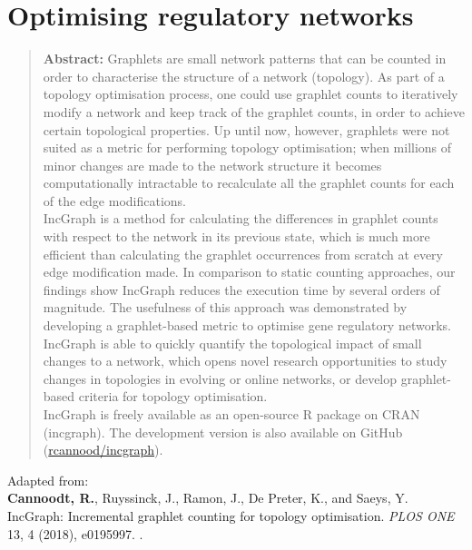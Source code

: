 \newpage{\thispagestyle{empty}\cleardoublepage}
\chapter{Optimising regulatory networks} 
\label{chap:incgraph}

\begin{quote}
	\textbf{Abstract:} Graphlets are small network patterns that can be counted in order to characterise the structure of a network (topology).
	As part of a topology optimisation process, one could use graphlet counts to iteratively modify a network and keep track of the graphlet counts, in order to achieve certain topological properties.
	Up until now, however, graphlets were not suited as a metric for performing topology optimisation; when millions of minor changes are made to the network structure it becomes computationally intractable to recalculate all the graphlet counts for each of the edge modifications. \\ IncGraph is a method for calculating the differences in graphlet counts with respect to the network in its previous state, which is much more efficient than calculating the graphlet occurrences from scratch at every edge modification made.
	In comparison to static counting approaches, our findings show IncGraph reduces the execution time by several orders of magnitude.
	The usefulness of this approach was demonstrated by developing a graphlet-based metric to optimise gene regulatory networks.
	IncGraph is able to quickly quantify the topological impact of small changes to a network, which opens novel research opportunities to study changes in topologies in evolving or online networks, or develop graphlet-based criteria for topology optimisation. \\
	IncGraph is freely available as an open-source R package on CRAN (incgraph). The development version is also available on GitHub (\href{http://www.github.com/rcannood/incgraph}{rcannood/incgraph}).
\end{quote}

\vfill

Adapted from:\\
\textbf{Cannoodt, R.}, Ruyssinck, J., Ramon, J., De Preter, K., and Saeys, Y. IncGraph: Incremental graphlet counting for topology optimisation. \textit{PLOS ONE} 13, 4 (2018), e0195997. .
\newpage


